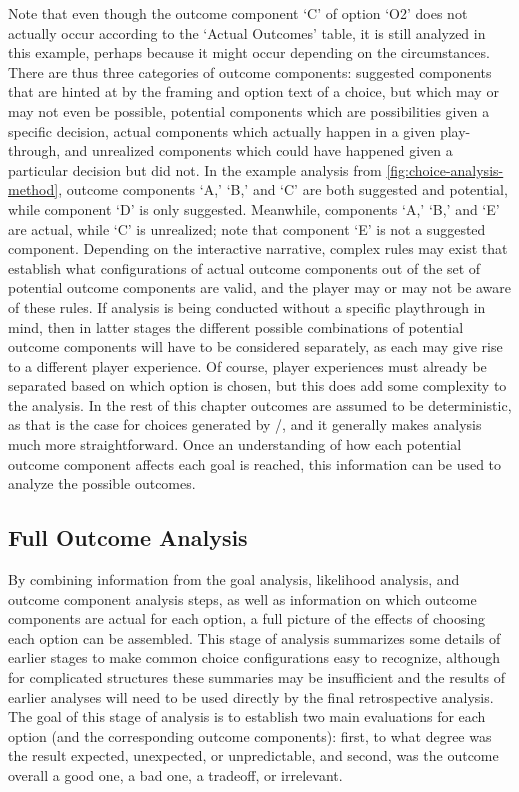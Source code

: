 Note that even though the outcome component `C' of option `O2' does not actually occur according to the `Actual Outcomes' table, it is still analyzed in this example, perhaps because it might occur depending on the circumstances.
%
There are thus three categories of outcome components: suggested components that are hinted at by the framing and option text of a choice, but which may or may not even be possible, potential components which are possibilities given a specific decision, actual components which actually happen in a given play-through, and unrealized components which could have happened given a particular decision but did not.
%
In the example analysis from \cref{fig:choice-analysis-method}, outcome components `A,' `B,' and `C' are both suggested and potential, while component `D' is only suggested.
%
Meanwhile, components `A,' `B,' and `E' are actual, while `C' is unrealized; note that component `E' is not a suggested component.
%
Depending on the interactive narrative, complex rules may exist that establish what configurations of actual outcome components out of the set of potential outcome components are valid, and the player may or may not be aware of these rules.
%
If analysis is being conducted without a specific playthrough in mind, then in latter stages the different possible combinations of potential outcome components will have to be considered separately, as each may give rise to a different player experience.
%
Of course, player experiences must already be separated based on which option is chosen, but this does add some complexity to the analysis.
%
In the rest of this chapter outcomes are assumed to be deterministic, as that is the case for choices generated by \dunyazad/, and it generally makes analysis much more straightforward.
%
Once an understanding of how each potential outcome component affects each goal is reached, this information can be used to analyze the possible outcomes.


\subsection{Full Outcome Analysis}

By combining information from the goal analysis, likelihood analysis, and outcome component analysis steps, as well as information on which outcome components are actual for each option, a full picture of the effects of choosing each option can be assembled.
%
This stage of analysis summarizes some details of earlier stages to make common choice configurations easy to recognize, although for complicated structures these summaries may be insufficient and the results of earlier analyses will need to be used directly by the final retrospective analysis.
%
The goal of this stage of analysis is to establish two main evaluations for each option (and the corresponding outcome components): first, to what degree was the result expected, unexpected, or unpredictable, and second, was the outcome overall a good one, a bad one, a tradeoff, or irrelevant.


